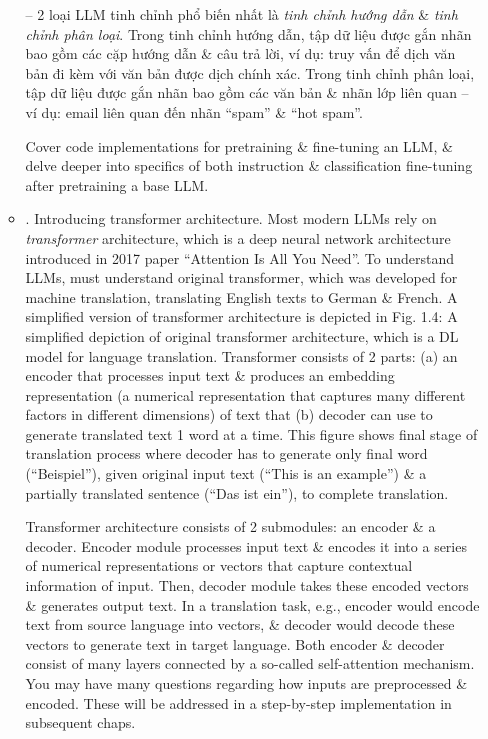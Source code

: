 \documentclass{article}
\begin{document}
\begin{itemize}
\begin{itemize}
		-- 2 loại LLM tinh chỉnh phổ biến nhất là {\it tinh chỉnh hướng dẫn} \& {\it tinh chỉnh phân loại}. Trong tinh chỉnh hướng dẫn, tập dữ liệu được gắn nhãn bao gồm các cặp hướng dẫn \& câu trả lời, ví dụ: truy vấn để dịch văn bản đi kèm với văn bản được dịch chính xác. Trong tinh chỉnh phân loại, tập dữ liệu được gắn nhãn bao gồm các văn bản \& nhãn lớp liên quan -- ví dụ: email liên quan đến nhãn ``spam'' \& ``hot spam''.
		
		Cover code implementations for pretraining \& fine-tuning an LLM, \& delve deeper into specifics of both instruction \& classification fine-tuning after pretraining a base LLM.
		\item {. Introducing transformer architecture.} Most modern LLMs rely on {\it transformer} architecture, which is a deep neural network architecture introduced in 2017 paper ``Attention Is All You Need''. To understand LLMs, must understand original transformer, which was developed for machine translation, translating English texts to German \& French. A simplified version of transformer architecture is depicted in {\sf Fig. 1.4: A simplified depiction of original transformer architecture, which is a DL model for language translation. Transformer consists of 2 parts: (a) an encoder that processes input text \& produces an embedding representation (a numerical representation that captures many different factors in different dimensions) of text that (b) decoder can use to generate translated text 1 word at a time. This figure shows final stage of translation process where decoder has to generate only final word (``Beispiel''), given original input text (``This is an example'') \& a partially translated sentence (``Das ist ein''), to complete translation.}
		
		Transformer architecture consists of 2 submodules: an encoder \& a decoder. Encoder module processes input text \& encodes it into a series of numerical representations or vectors that capture contextual information of input. Then, decoder module takes these encoded vectors \& generates output text. In a translation task, e.g., encoder would encode text from source language into vectors, \& decoder would decode these vectors to generate text in target language. Both encoder \& decoder consist of many layers connected by a so-called self-attention mechanism. You may have many questions regarding how inputs are preprocessed \& encoded. These will be addressed in a step-by-step implementation in subsequent chaps.
		

\end{itemize}
\end{itemize}
\end{document}
